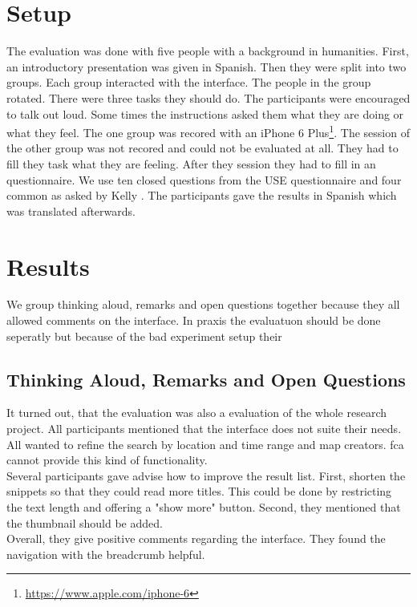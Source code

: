 \documentclass[11pt]{report}
\begin{document}
{{\section{Setup}

The evaluation was done with five people with a background in humanities. First, an introductory presentation was given in Spanish. Then they were split into two groups. Each group interacted with the interface. The people in the group rotated. There were three tasks they should do. The participants were encouraged to talk out loud. Some times the instructions asked them what they are doing or what they feel. The one group was recored with an iPhone 6 Plus\footnote{\url{https://www.apple.com/iphone-6}}. The session of the other group was not recored and could not be evaluated at all. They had to fill they task what they are feeling. After they session they had to fill in an questionnaire. We use ten closed questions from the USE questionnaire \cite{lund2001measuring} and four common as asked by Kelly \cite{Kelly2008}. The participants gave the results in Spanish which was translated afterwards.

\section{Results}

We group thinking aloud, remarks and open questions together because they all allowed comments on the interface. In praxis the evaluatuon should be done seperatly but because of the bad experiment setup their 

\subsection{Thinking Aloud, Remarks and Open Questions}
It turned out, that the evaluation was also a evaluation of the whole research project. All participants mentioned that the interface does not suite their needs. All wanted to refine the search by location and time range and map creators. \acrshort{fca} cannot provide this kind of functionality.\\

Several participants gave advise how to improve the result list. First, shorten the snippets so that they could read more titles. This could be done by restricting the text length and offering a "show more" button. Second, they mentioned that the thumbnail should be added. \\

Overall, they give positive comments regarding the interface. They found the navigation with the breadcrumb helpful. \\

}}
\end{document}
